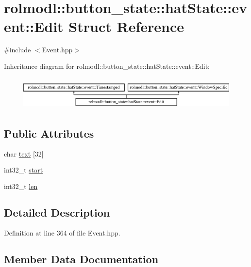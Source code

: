 \hypertarget{structrolmodl_1_1button__state_1_1hat_state_1_1event_1_1_edit}{}\section{rolmodl\+::button\+\_\+state\+::hat\+State\+::event\+::Edit Struct Reference}
\label{structrolmodl_1_1button__state_1_1hat_state_1_1event_1_1_edit}


{\ttfamily \#include $<$Event.\+hpp$>$}

Inheritance diagram for rolmodl\+::button\+\_\+state\+::hat\+State\+::event\+::Edit\+:\begin{figure}[H]
\begin{center}
\leavevmode
\includegraphics[height=1.761006cm]{structrolmodl_1_1button__state_1_1hat_state_1_1event_1_1_edit}
\end{center}
\end{figure}
\subsection*{Public Attributes}
\begin{DoxyCompactItemize}
\item 
char \mbox{\hyperlink{structrolmodl_1_1button__state_1_1hat_state_1_1event_1_1_edit_a94d119dadc822ab2ba1fb04202d17602}{text}} \mbox{[}32\mbox{]}
\item 
int32\+\_\+t \mbox{\hyperlink{structrolmodl_1_1button__state_1_1hat_state_1_1event_1_1_edit_aae557e7b09b7d19721a40a65fac8280b}{start}}
\item 
int32\+\_\+t \mbox{\hyperlink{structrolmodl_1_1button__state_1_1hat_state_1_1event_1_1_edit_a8dab38e403e7520a5b4de52135982b23}{len}}
\end{DoxyCompactItemize}


\subsection{Detailed Description}


Definition at line 364 of file Event.\+hpp.



\subsection{Member Data Documentation}
\mbox{\label{structrolmodl_1_1button__state_1_1hat_state_1_1event_1_1_edit_a8dab38e403e7520a5b4de52135982b23}} 
